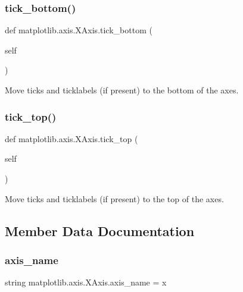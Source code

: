 \subsubsection{\texorpdfstring{tick\+\_\+bottom()}{tick\_bottom()}}
{\footnotesize\ttfamily def matplotlib.\+axis.\+X\+Axis.\+tick\+\_\+bottom (\begin{DoxyParamCaption}\item[{}]{self }\end{DoxyParamCaption})}

\begin{DoxyVerb}Move ticks and ticklabels (if present) to the bottom of the axes.
\end{DoxyVerb}
 \mbox{\label{classmatplotlib_1_1axis_1_1XAxis_a84db896e21eeb2910261e42a13a55d84}} 
\subsubsection{\texorpdfstring{tick\+\_\+top()}{tick\_top()}}
{\footnotesize\ttfamily def matplotlib.\+axis.\+X\+Axis.\+tick\+\_\+top (\begin{DoxyParamCaption}\item[{}]{self }\end{DoxyParamCaption})}

\begin{DoxyVerb}Move ticks and ticklabels (if present) to the top of the axes.
\end{DoxyVerb}
 

\subsection{Member Data Documentation}
\mbox{\label{classmatplotlib_1_1axis_1_1XAxis_ad6c67c851f7d7494eb11176885a09fe0}} 
\subsubsection{\texorpdfstring{axis\+\_\+name}{axis\_name}}
{\footnotesize\ttfamily string matplotlib.\+axis.\+X\+Axis.\+axis\+\_\+name = \textquotesingle{}x\textquotesingle{}\hspace{0.3cm}{\ttfamily [static]}}

